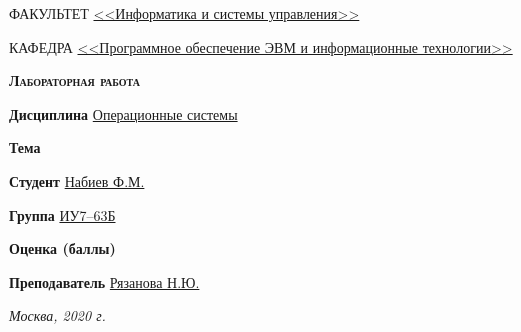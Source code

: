 \begin{titlepage}
    \begin{flushleft}
        \small
        ФАКУЛЬТЕТ \uline{<<Информатика и системы управления>> \hfill} \par
        \vspace{0.25cm}
        КАФЕДРА \uline{<<Программное обеспечение ЭВМ и информационные технологии>> \hfill} \par
    \end{flushleft}

    \vspace{4cm}

    {\LARGE\scshape\bfseries
        Лабораторная работа \textnumero
    }

    \vspace{2cm}

    \begin{flushleft}
        \large
        \begin{minipage}[t]{0.8\linewidth}
            \textbf{Дисциплина }\uline{\hfill Операционные системы \hfill} \par
            \vspace{0.25cm}
            \textbf{Тема }\uline{\hfill \hfill} \par
        \end{minipage}

        \vspace{1cm}

        \begin{minipage}[t]{0.6\linewidth}
            \textbf{Студент }\uline{\hfill Набиев Ф.М. \hfill} \par
            \vspace{0.25cm}
            \textbf{Группа }\uline{\hfill ИУ7--63Б \hfill} \par
            \vspace{0.25cm}
            \textbf{Оценка (баллы) }\uline{\hfill \hfill} \par
            \vspace{0.25cm}
            \textbf{Преподаватель }\uline{\hfill Рязанова Н.Ю. \hfill} \par
        \end{minipage}

    \end{flushleft}

    \vfill

    \it
    Москва, 2020 г.

\end{titlepage}


